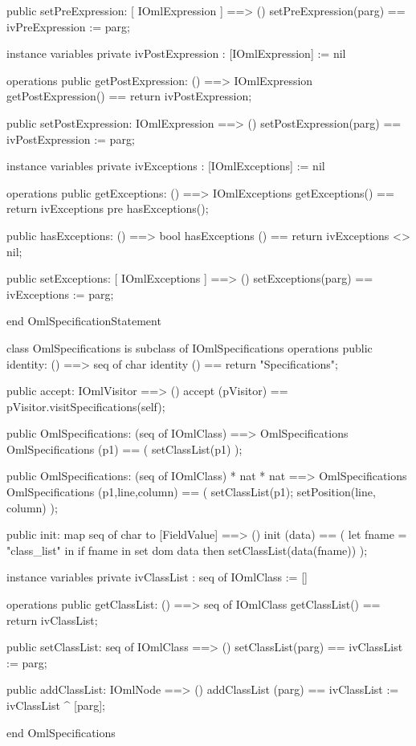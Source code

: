 \begin{vdm_al}
  public setPreExpression: [ IOmlExpression ] ==> ()
  setPreExpression(parg) == ivPreExpression := parg;

instance variables
  private ivPostExpression : [IOmlExpression] := nil

operations
  public getPostExpression: () ==> IOmlExpression
  getPostExpression() == return ivPostExpression;

  public setPostExpression: IOmlExpression ==> ()
  setPostExpression(parg) == ivPostExpression := parg;

instance variables
  private ivExceptions : [IOmlExceptions] := nil

operations
  public getExceptions: () ==> IOmlExceptions
  getExceptions() == return ivExceptions
    pre hasExceptions();

  public hasExceptions: () ==> bool
  hasExceptions () == return ivExceptions <> nil;

  public setExceptions: [ IOmlExceptions ] ==> ()
  setExceptions(parg) == ivExceptions := parg;

end OmlSpecificationStatement
\end{vdm_al}

\begin{vdm_al}
class OmlSpecifications is subclass of IOmlSpecifications
operations
  public identity: () ==> seq of char
  identity () == return "Specifications";

  public accept: IOmlVisitor ==> ()
  accept (pVisitor) == pVisitor.visitSpecifications(self);

  public OmlSpecifications:
    (seq of IOmlClass) ==> OmlSpecifications
  OmlSpecifications (p1) == 
    ( setClassList(p1) );

  public OmlSpecifications:
    (seq of IOmlClass) *
    nat *
    nat ==> OmlSpecifications
  OmlSpecifications (p1,line,column) == 
    ( setClassList(p1);
      setPosition(line, column) );

  public init: map seq of char to [FieldValue] ==> ()
  init (data) ==
    ( let fname = "class_list" in
        if fname in set dom data
        then setClassList(data(fname)) );

instance variables
  private ivClassList : seq of IOmlClass := []

operations
  public getClassList: () ==> seq of IOmlClass
  getClassList() == return ivClassList;

  public setClassList: seq of IOmlClass ==> ()
  setClassList(parg) == ivClassList := parg;

  public addClassList: IOmlNode ==> ()
  addClassList (parg) == ivClassList := ivClassList ^ [parg];

end OmlSpecifications
\end{vdm_al}

